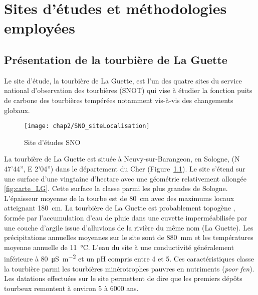 
\chapter{Sites d'études et méthodologies employées}

\minitoc

\newpage

\section{Présentation de la tourbière de La Guette}

Le site d'étude, la tourbière de La Guette, est l'un des quatre sites du service national d'observation des tourbières (SNOT) qui vise à étudier la fonction puits de carbone des tourbières tempérées notamment vis-à-vis des changements globaux.

\begin{figure}[h]
\centering
\texttt{[image: chap2/SNO\_siteLocalisation]}
\caption{Site d'études SNO}
\label{fig:carte_europe}
\end{figure}

La tourbière de La Guette est située à Neuvy-sur-Barangeon, en Sologne, (N 47’44”, E 2’04”) dans le département du Cher (Figure~\ref{fig:carte_europe}).
Le site s'étend sur une surface d'une vingtaine d'hectare avec une géométrie relativement allongée \ref{fig:carte_LG}.
Cette surface la classe parmi les plus grandes de Sologne.
L'épaisseur moyenne de la tourbe est de \SI{80}{\centi\metre} avec des maximums locaux atteignant \SI{180}{\centi\metre}.
La tourbière de La Guette est probablement topogène \plop, formée par l'accumulation d'eau de pluie dans une cuvette imperméabilisée par une couche d'argile issue d'alluvions de la rivière du même nom (La Guette).
Les précipitations annuelles moyennes sur le site sont de \SI{880}{\milli\metre} et les températures moyenne annuelle de \SI{11}{\degreeCelsius}.
L'eau du site à une conductivité généralement inférieure à \SI{80}{\micro\siemens\per\square\metre} et un pH compris entre 4 et 5.
Ces caractéristiques classe la tourbière parmi les tourbières minérotrophes pauvres en nutriments (\textit{poor fen}).
Les datations effectuées sur le site permettent de dire que les premiers dépôts tourbeux remontent à environ 5 à 6000 ans.

